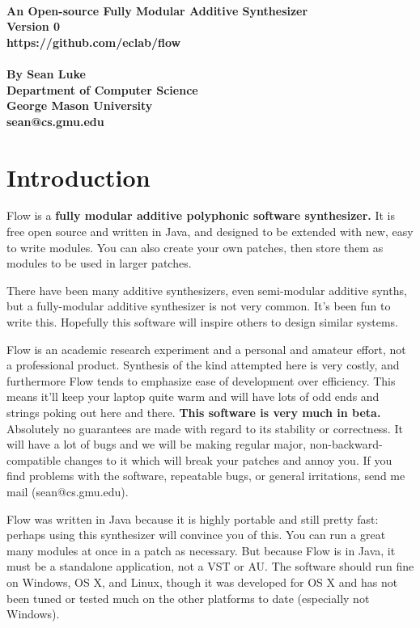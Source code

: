 \documentclass{article}
\newcommand\name{Flow}
\begin{document}
\noindent {\Huge\bf {\name}}\\[0.5em]
{\large \bf An Open-source Fully Modular Additive Synthesizer\\[0.2em]
Version 0\\[0.2em]
https://github.com/eclab/flow\\\\[0.2em]
By Sean Luke\\[0.2em]
Department of Computer Science\\[0.25em]
George Mason University\\[0.2em]
sean@cs.gmu.edu}

\vspace{2em}
\tableofcontents

\clearpage

\section{Introduction}

{\name} is a {\bf fully modular additive polyphonic software synthesizer.}  It is free open source and written in Java, and designed to be extended with new, easy to write modules.  You can also create your own patches, then store them as modules to be used in larger patches. 

There have been many additive synthesizers, even semi-modular additive synths, but a fully-modular additive synthesizer is not very common.   It's been fun to write this.  Hopefully this software will inspire others to design similar systems.

{\name} is an academic research experiment and a personal and amateur effort, not a professional product.  Synthesis of the kind attempted here is very costly, and furthermore {\name} tends to emphasize ease of development over efficiency.  This means it'll keep your laptop quite warm and will have lots of odd ends and strings poking out here and there.  {\bf This software is very much in beta.} Absolutely no guarantees are made with regard to its stability or correctness.  It will have a lot of bugs and we will be making regular major, non-backward-compatible changes to it which will break your patches and annoy you.  If you find problems with the software, repeatable bugs, or general irritations, send me mail (sean@cs.gmu.edu).

{\name} was written in Java because it is highly portable and still pretty fast: perhaps using this synthesizer will convince you of this.  You can run a great many modules at once in a patch as necessary.  But because {\name} is in Java, it must be a standalone application, not a VST or AU.  The software should run fine on Windows, OS X, and Linux, though it was developed for OS X and has not been tuned or tested much on the other platforms to date (especially not Windows).
\end{document}
